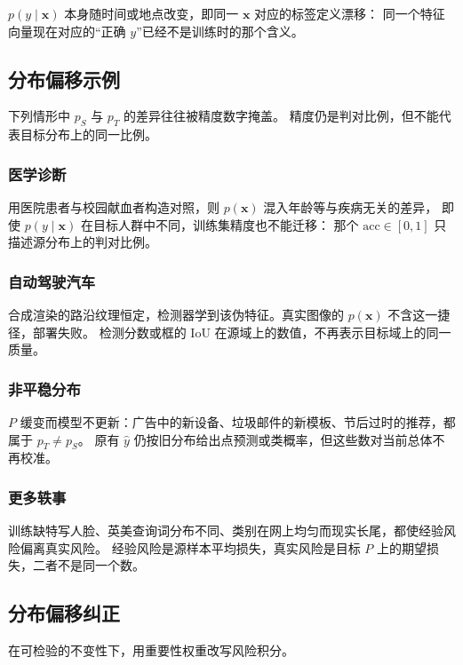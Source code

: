 $p(y\mid\bm{x})$ 本身随时间或地点改变，即同一 $\bm{x}$ 对应的标签定义漂移：
同一个特征向量现在对应的“正确 $y$”已经不是训练时的那个含义。

\subsection{分布偏移示例}

下列情形中 $p_{S}$ 与 $p_{T}$ 的差异往往被精度数字掩盖。
精度仍是判对比例，但不能代表目标分布上的同一比例。

\subsubsection{医学诊断}

用医院患者与校园献血者构造对照，则 $p(\bm{x})$ 混入年龄等与疾病无关的差异，
即使 $p(y\mid\bm{x})$ 在目标人群中不同，训练集精度也不能迁移：
那个 $\mathrm{acc}\in[0,1]$ 只描述源分布上的判对比例。

\subsubsection{自动驾驶汽车}

合成渲染的路沿纹理恒定，检测器学到该伪特征。真实图像的 $p(\bm{x})$ 不含这一捷径，部署失败。
检测分数或框的 IoU 在源域上的数值，不再表示目标域上的同一质量。

\subsubsection{非平稳分布}

$P$ 缓变而模型不更新：广告中的新设备、垃圾邮件的新模板、节后过时的推荐，都属于 $p_{T}\neq p_{S}$。
原有 $\hat{y}$ 仍按旧分布给出点预测或类概率，但这些数对当前总体不再校准。

\subsubsection{更多轶事}

训练缺特写人脸、英美查询词分布不同、类别在网上均匀而现实长尾，都使经验风险偏离真实风险。
经验风险是源样本平均损失，真实风险是目标 $P$ 上的期望损失，二者不是同一个数。

\subsection{分布偏移纠正}

在可检验的不变性下，用重要性权重改写风险积分。

